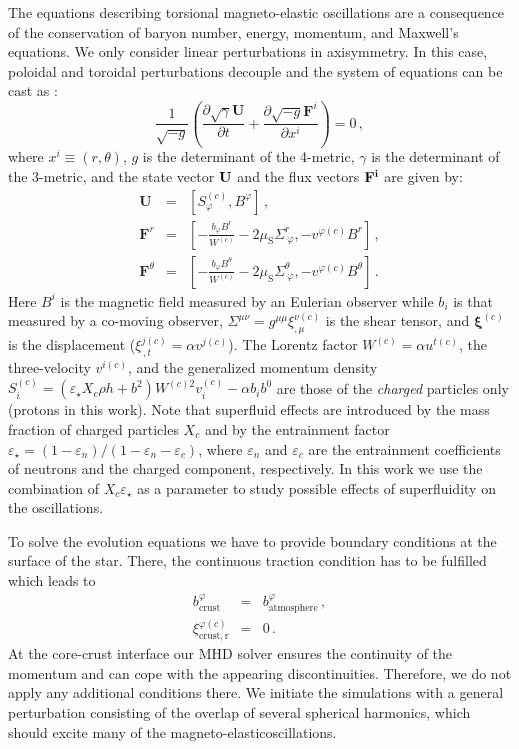 \documentclass[useAMS,usenatbib]{mnras}
\begin{document}
The equations describing torsional magneto-elastic oscillations are a consequence of the conservation of baryon number, energy, momentum, and Maxwell's equations. We only consider linear perturbations in axisymmetry. In this case, poloidal and toroidal perturbations decouple and the system of equations can be cast as \citep{Gabler2011letter, Gabler2012, Gabler2016}:
\begin{equation}
 \frac{1}{\sqrt{-g}} \left( \frac{\partial\sqrt{\gamma} \mathbf{U}
}{\partial t} +
\frac{\partial \sqrt{-g} \mathbf{F}^i}{\partial x^i} \right) = 0\,,
\label{conservationlaw}
\end{equation}
where $x^i\equiv (r,\theta)$, $g$ is the determinant of the 4-metric, $\gamma$ is the determinant of the 3-metric, and the state vector $\bf U$ and the flux vectors $\bf F^i$ are given by:
\begin{eqnarray}
 \mathbf{U} &=& [S^{(c)}_\varphi, B^\varphi]  \label{reduced_withcrust1_c}\,,\\
 \mathbf{F}^r &=& \left[ -
\frac{b_\varphi B^r}{W^{(c)}} - 2 \mu_\mathrm{S}
\Sigma^r_{~\varphi}, - v^{\varphi(c)} B^r
\right]\,,  \label{flux_r_p}\\
 \mathbf{F}^\theta &=& \left[ - \frac{b_\varphi B^\theta}{W^{(c)}}- 2
\mu_\mathrm{S} \Sigma^\theta_{~\varphi},
-v^{\varphi(c)} B^\theta
\right]\,.\label{flux_theta_p}\label{reduced_withcrust2_c}
\end{eqnarray}
Here $B^i$ is the magnetic field measured by an Eulerian observer while $b_i$ is that measured by a co-moving observer, $\Sigma^{\mu\nu} = g^{\mu\mu} \xi^{\nu(c)}_{,\mu}$ is the shear tensor, and $\mathbf{\xi}^{(c)}$ is the displacement ($\xi^{j(c)}_{\,,t} = \alpha v^{j(c)}$). The Lorentz factor $W^{(c)}=\alpha u^{t(c)}$, the three-velocity $v^{i(c)}$, and the generalized momentum density $S^{(c)}_i=(\varepsilon_\star X_c \rho h + b^2) W^{(c)2} v^{(c)}_i - \alpha b_i b^0$ are those of 
the {\it charged} particles only (protons in this work). Note that superfluid effects are introduced by the mass fraction of charged particles $X_c$ and by the entrainment factor $\varepsilon_\star  = (1-\varepsilon_n)/(1-\varepsilon_n-\varepsilon_c)$, where $\varepsilon_n$ and $\varepsilon_c$ are the entrainment coefficients of neutrons and the charged component, respectively. In this work we use the combination of $X_c \varepsilon_\star$ as a parameter to study possible effects of superfluidity on the oscillations.

To solve the evolution equations we have to provide boundary conditions at the 
surface of the star. There, the continuous traction condition has to be 
fulfilled which leads to 
\begin{eqnarray}
 b^\varphi_\mathrm{crust} &=& b^\varphi_\mathrm{atmosphere}\,,\\
\xi^{\varphi(c)}_\mathrm{crust,r}&=&0\,.
\end{eqnarray}
At the core-crust interface our MHD solver ensures the continuity of the 
momentum and can cope with the appearing discontinuities. Therefore, we do not 
apply any additional conditions there. 
We initiate the simulations with a general perturbation consisting of the 
overlap of several spherical harmonics, which should excite many of the 
magneto-elasticoscillations. 
\end{document}
